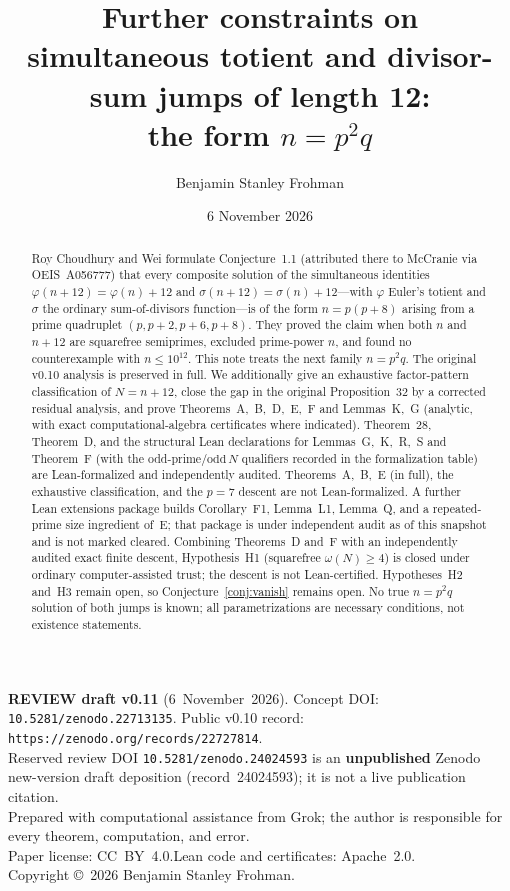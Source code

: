 \documentclass[11pt,reqno]{amsart}
\title[Totient and divisor-sum jumps of length 12]{Further constraints on simultaneous totient and divisor-sum jumps of length 12:\\ the form \(n=p^2q\)}
\author{Benjamin Stanley Frohman}
\date{6 November 2026}
\newcommand{\ph}{\varphi}
\newcommand{\sig}{\sigma}
\theoremstyle{definition}
\begin{document}
\begin{abstract}
Roy Choudhury and Wei formulate Conjecture~1.1 (attributed there to McCranie via OEIS~A056777) that every composite solution of the simultaneous identities
\(\ph(n+12)=\ph(n)+12\) and \(\sig(n+12)=\sig(n)+12\)---with \(\ph\) Euler's totient and \(\sig\) the ordinary sum-of-divisors function---is of the form \(n=p(p+8)\) arising from a prime quadruplet
\((p,p+2,p+6,p+8)\). They proved the claim when both \(n\) and \(n+12\) are squarefree semiprimes, excluded prime-power
\(n\), and found no counterexample with \(n\le 10^{12}\). This note treats the next family \(n=p^2q\).
The original v0.10 analysis is preserved in full. We additionally give an exhaustive factor-pattern classification of \(N=n+12\), close the gap in the original Proposition~32 by a corrected residual analysis, and prove Theorems~A,~B,~D,~E,~F and Lemmas~K,~G (analytic, with exact computational-algebra certificates where indicated). Theorem~28, Theorem~D, and the structural Lean declarations for Lemmas~G,~K,~R,~S and Theorem~F (with the odd-prime/\(\mathrm{odd}\,N\) qualifiers recorded in the formalization table) are Lean-formalized and independently audited. Theorems~A,~B,~E (in full), the exhaustive classification, and the \(p=7\) descent are not Lean-formalized. A further Lean extensions package builds Corollary~F1, Lemma~L1, Lemma~Q, and a repeated-prime size ingredient of~E; that package is under independent audit as of this snapshot and is not marked cleared. Combining Theorems~D and~F with an independently audited exact finite descent, Hypothesis~H1 (squarefree \(\omega(N)\ge 4\)) is closed under ordinary computer-assisted trust; the descent is not Lean-certified. Hypotheses~H2 and~H3 remain open, so Conjecture~\ref{conj:vanish} remains open. No true \(n=p^2q\) solution of both jumps is known; all parametrizations are necessary conditions, not existence statements.
\end{abstract}

\maketitle

\vspace{-0.7em}
{\small\noindent
\textbf{REVIEW draft v0.11} (6~November~2026).\quad
Concept DOI: \texttt{10.5281/zenodo.22713135}.\quad
Public v0.10 record: \texttt{https://zenodo.org/records/22727814}.\\
Reserved review DOI \texttt{10.5281/zenodo.24024593} is an \textbf{unpublished} Zenodo new-version draft deposition (record~24024593); it is not a live publication citation.\\
Prepared with computational assistance from Grok; the author is responsible for every theorem, computation, and error.\\
Paper license: CC~BY~4.0.\quad Lean code and certificates: Apache~2.0.\\
Copyright \copyright\ 2026 Benjamin Stanley Frohman.}
\end{document}
